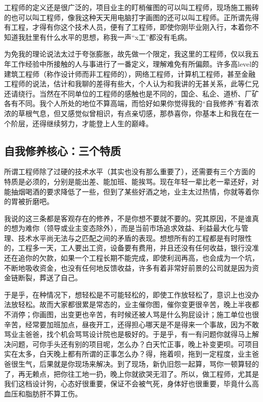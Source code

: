 \documentclass[]{book}
\begin{document}
工程师的定义还是很广泛的，项目业主的盯梢催图的可以叫工程师，现场施工搬砖的也可以叫工程师，像我这种天天用电脑打字画图的还可以叫工程师。正所谓先得有工程，才得有你这个技术人员，便有了工程师，即使你刚毕业刚入行，本着你不知道我肚里有什么水平的思想，称我一声``x工''都没有毛病。

为免我的理论说法太过于夸张膨胀，故先做一个限定，我这里的工程师，仅以我五年工作经验中所接触的人与事进行了一番定义，理解难免有所偏颇。许多高level的建筑工程师（称作设计师而非工程师的），网络工程师，计算机工程师，甚至金融工程师的说法，估计和我聊的差得有些大，个人认为和我讲的无甚关系，此等仁兄还请绕行。当然在不同单位的工程师的感触也是不同的，国企、私企、道桥、厂矿各有不同。我个人所处的地位不算高端，而恰好如果你觉得我的``自我修养''有着浓浓的草根气息，但又感觉似曾相识，有点亲切感，那恭喜你，你基本上和我在在一个阶层，还得继续努力，才能登上人生的巅峰。

\hypertarget{ux81eaux6211ux4feeux517bux6838ux5fc3ux4e09ux4e2aux7279ux8d28}{%
\subsection{自我修养核心：三个特质}\label{ux81eaux6211ux4feeux517bux6838ux5fc3ux4e09ux4e2aux7279ux8d28}}

所谓工程师除了过硬的技术水平（其实也没有那么重要了），还需要有三个方面的特质是必须的，分别是能出差、能加班、能挨骂。现在年轻一辈比老一辈还好，对能抽烟喝酒的要求降低了一些，但到了某些好酒之地，业主太过热情，你就等着你的胃被折磨吧。

我说的这三条都是客观存在的修养，不是你想不要就不要的。究其原因，不是谁真的想为难你（领导或业主变态除外），而是当前市场追求效益、利益最大化与管理、技术水平尚无法与之匹配之间的矛盾的表现。想想所有的工程都是有时限性的，工程多一天，工人要出工资，设备要有费用，并且还没有任何收益，银行没准还在追你的欠款，如果一个工程长期不能完成，即使利润再高，也会成为一个坑，不断地吸收资金，也没有任何地反馈收益，许多有着非常好前景的公司就是因为资金链断裂，葬送了自己。

于是乎，在种情况下，想轻松是不可能轻松的，即使工作放轻松了，意识上也没办法放轻松。故而大家都很累是常态的，业主催你图，催你变更很辛苦，晚上半夜都不消停；你画图，出变更也辛苦，有时候还被人骂是什么狗屁设计；施工单位也很辛苦，经常要加班加点，昼夜开工，还得担心哪天是不是得来一个事故，因为不敢骂业主爸爸，找个机会骂骂设计院也是极好的。于是乎，有一有问题你就得马上解决问题，可你手头还有别的项目呢，怎么办？白天忙正事，晚上补变更呗。可项目实在太多，白天晚上都有所谓的正事怎么办？得，拖着呗，拖到一定程度，业主爸爸很生气，后果就是你现场来解决。到了现场，新仇旧怨一起算，骂你一顿算轻的了，再无赖点，把你往工地一扔，晚上你就欲哭无泪了。所以，做工程师，尤其是我们这档设计狗，心态好很重要，保证不会被气死，身体好也很重要，毕竟什么高血压和脂肪肝不算工伤。
\end{document}
